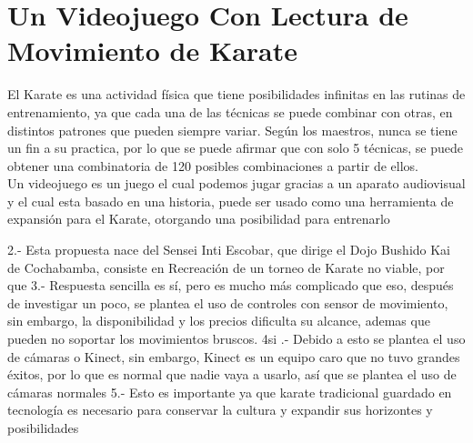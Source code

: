 \section{Un Videojuego Con Lectura de Movimiento de Karate}

El Karate es una actividad física que tiene posibilidades infinitas en las rutinas de entrenamiento, ya que cada una de las técnicas se puede combinar con otras, en distintos patrones que pueden siempre variar. Según los maestros, nunca se tiene un fin a su practica, por lo que se puede afirmar que con solo 5 técnicas, se puede obtener una combinatoria de 120 posibles combinaciones a partir de ellos.\\

Un videojuego es un juego el cual podemos jugar gracias a un aparato audiovisual y el cual esta basado en una historia\cite{esposito2005shorts}, puede ser usado como una herramienta de expansión para el Karate, otorgando una posibilidad para entrenarlo




2.- Esta propuesta nace del Sensei Inti Escobar, que dirige el Dojo Bushido Kai de Cochabamba, consiste en  Recreación de un torneo de Karate no viable, por que
3.- Respuesta sencilla es sí, pero es mucho más complicado que eso, después de investigar un poco, se plantea el uso de controles con sensor de movimiento, sin embargo, la disponibilidad y los precios dificulta su alcance, ademas que pueden no soportar los movimientos bruscos.
4si .- Debido a esto se plantea el uso de cámaras o Kinect, sin embargo, Kinect es un equipo caro que no tuvo grandes éxitos, por lo que es normal que nadie vaya a usarlo, así que se plantea el uso de cámaras normales
5.- Esto es importante ya que karate tradicional guardado en tecnología es necesario para conservar la cultura y expandir sus horizontes y posibilidades

















